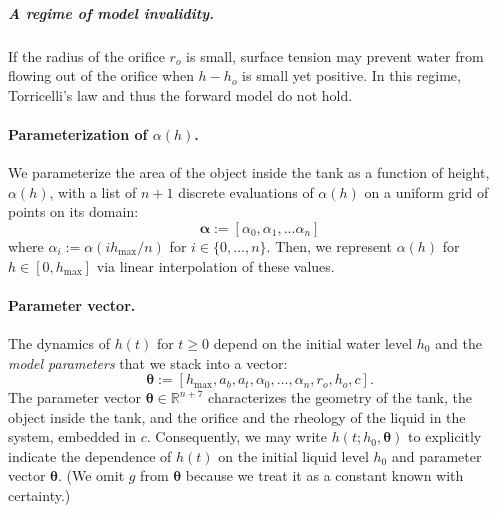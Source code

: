 \documentclass[openacc]{rsproca_new}%
\begin{document}
\vspace{-\baselineskip}
\subparagraph{A regime of model invalidity.} If the radius of the orifice $r_o$ is small, surface tension may prevent water from flowing out of the orifice when $h- h_o$ is small yet positive. In this regime, Torricelli's law and thus the forward model do not hold.

\paragraph{Parameterization of $\alpha(h)$.}
We parameterize the area of the object inside the tank as a function of height, $\alpha(h)$, with a list of $n+1$ discrete evaluations of $\alpha(h)$ on a uniform grid of points on its domain:
\begin{equation}
	\boldsymbol \alpha := [\alpha_0, \alpha_1, ... \alpha_n]
\end{equation}
where $\alpha_i :=\alpha(i h_{\text{max}}/n)$ for $i \in \{0, ..., n\}$. Then, we represent $\alpha(h)$ for $h\in [0, h_{\text{max}}]$ via linear interpolation of these values.

\paragraph{Parameter vector.} The dynamics of $h(t)$ for $t\geq 0$ depend on the initial water level $h_0$ and the \emph{model parameters} that we stack into a vector:
\begin{equation}
	\boldsymbol \theta := [h_{\text{max}}, a_b, a_t, \alpha_0, ..., \alpha_n , r_o, h_o, c]. \label{eq:theta}
\end{equation}
The parameter vector $\boldsymbol \theta \in \mathbb{R}^{n+7}$ characterizes the geometry of the tank, the object inside the tank, and the orifice and the rheology of the liquid in the system, embedded in $c$. 
Consequently, we may write $h(t; h_0, \boldsymbol \theta)$ to explicitly indicate the dependence of $h(t)$ on the initial liquid level $h_0$ and parameter vector $\boldsymbol \theta$. (We omit $g$ from $\boldsymbol \theta$ because we treat it as a constant known with certainty.)
\end{document}
